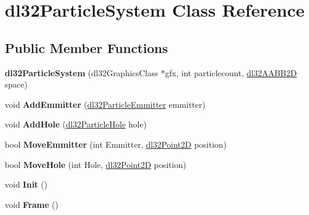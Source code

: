 \hypertarget{classdl32_particle_system}{\section{dl32\-Particle\-System Class Reference}
\label{classdl32_particle_system}
}
\subsection*{Public Member Functions}
\begin{DoxyCompactItemize}
\item 
\hypertarget{classdl32_particle_system_aefa8ee5feba0d32f6048782b4d581076}{{\bfseries dl32\-Particle\-System} (dl32\-Graphics\-Class $\ast$gfx, int particlecount, \hyperlink{classdl32_a_a_b_b2_d}{dl32\-A\-A\-B\-B2\-D} space)}\label{classdl32_particle_system_aefa8ee5feba0d32f6048782b4d581076}

\item 
\hypertarget{classdl32_particle_system_a485bfb64b1a76cc9302da3aaccb1cbef}{void {\bfseries Add\-Emmitter} (\hyperlink{structdl32_particle_emmitter}{dl32\-Particle\-Emmitter} emmitter)}\label{classdl32_particle_system_a485bfb64b1a76cc9302da3aaccb1cbef}

\item 
\hypertarget{classdl32_particle_system_a281eef70082ed2384708140257e1dd63}{void {\bfseries Add\-Hole} (\hyperlink{structdl32_particle_hole}{dl32\-Particle\-Hole} hole)}\label{classdl32_particle_system_a281eef70082ed2384708140257e1dd63}

\item 
\hypertarget{classdl32_particle_system_a10927004cd29802beedf53edd51ecb83}{bool {\bfseries Move\-Emmitter} (int Emmitter, \hyperlink{structdl32_point2_d}{dl32\-Point2\-D} position)}\label{classdl32_particle_system_a10927004cd29802beedf53edd51ecb83}

\item 
\hypertarget{classdl32_particle_system_ade780d7a8ae25cea5af7397e01538c8c}{bool {\bfseries Move\-Hole} (int Hole, \hyperlink{structdl32_point2_d}{dl32\-Point2\-D} position)}\label{classdl32_particle_system_ade780d7a8ae25cea5af7397e01538c8c}

\item 
\hypertarget{classdl32_particle_system_a7bf0c954bff704465f017f787028f1a6}{void {\bfseries Init} ()}\label{classdl32_particle_system_a7bf0c954bff704465f017f787028f1a6}

\item 
\hypertarget{classdl32_particle_system_a58f9f17c37d2af4c6bca53c1b9f88512}{void {\bfseries Frame} ()}\label{classdl32_particle_system_a58f9f17c37d2af4c6bca53c1b9f88512}


\end{DoxyCompactItemize}

